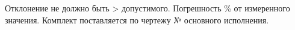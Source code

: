 Отклонение не должно быть > допустимого. %
Погрешность \% от измеренного значения. %
Комплект поставляется по чертежу № основного исполнения. %
